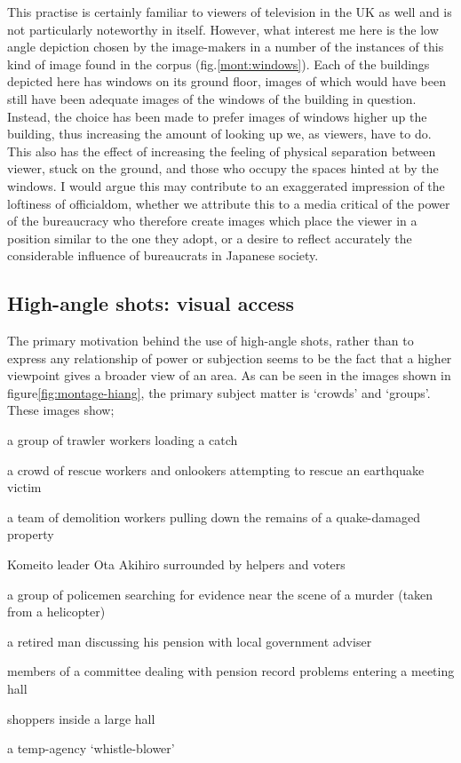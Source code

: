 This practise is certainly familiar to viewers of television in the UK as well and is not particularly noteworthy in itself. However, what interest me here is the low angle depiction chosen by the image-makers in a number of the instances of this kind of image found in the corpus (fig.\ref{mont:windows}). Each of the buildings depicted here has windows on its ground floor, images of which would have been still have been adequate images of the windows of the building in question. Instead, the choice has been made to prefer images of windows higher up the building, thus increasing the amount of looking up we, as viewers, have to do. This also has the effect of increasing the feeling of physical separation between viewer, stuck on the ground, and those who occupy the spaces hinted at by the windows. I would argue this may contribute to an exaggerated impression of the loftiness of officialdom, whether we attribute this to a media critical of the power of the bureaucracy who therefore create images which place the viewer in a position similar to the one they adopt, or a desire to reflect accurately the considerable influence of bureaucrats in Japanese society.

\subsection{High-angle shots: visual access}
The primary motivation behind the use of high-angle shots, rather than to express any relationship of power or subjection seems to be the fact that a higher viewpoint gives a broader view of an area. As can be seen in the images shown in figure\ref{fig:montage-hiang}, the primary subject matter is `crowds' and `groups'. These images show; 

\begin{close_enum}
\item a group of trawler workers loading a catch
\item a crowd of rescue workers and onlookers attempting to rescue an earthquake victim
\item a team of demolition workers pulling down the remains of a quake-damaged property
\item Komeito leader Ota Akihiro surrounded by helpers and voters
\item a group of policemen searching for evidence near the scene of a murder (taken from a helicopter)
\item a retired man discussing his pension with local government adviser
\item members of a committee dealing with pension record problems entering a meeting hall
\item shoppers inside a large hall
\item a temp-agency `whistle-blower'
\end{close_enum}

